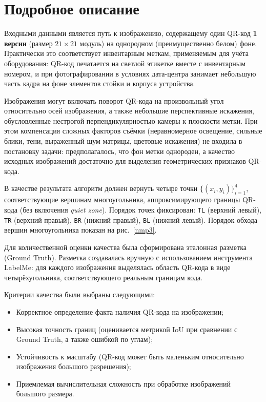 \section{Подробное описание}
Входными данными является путь к изображению, содержащему один QR-код \textbf{1 версии} (размер $21 \times 21$ модуль) на однородном (преимущественно белом) фоне.
Практически это соответствует инвентарным меткам, применяемым для учёта оборудования: QR-код печатается на светлой этикетке вместе с инвентарным номером, и при фотографировании в условиях дата-центра занимает небольшую часть кадра на фоне элементов стойки и корпуса устройства.

Изображения могут включать поворот QR-кода на произвольный угол относительно осей изображения, а также небольшие перспективные искажения, обусловленные нестрогой перпендикулярностью камеры к плоскости метки.
При этом компенсация сложных факторов съёмки (неравномерное освещение, сильные блики, тени, выраженный шум матрицы, цветовые искажения) не входила в постановку задачи: предполагалось, что фон метки однороден, а качество исходных изображений достаточно для выделения геометрических признаков QR-кода.

В качестве результата алгоритм должен вернуть четыре точки $\{(x_i, y_i)\}_{i=1}^{4}$,
соответствующие вершинам многоугольника, аппроксимирующего границы QR-кода (без включения \textit{quiet zone}).
Порядок точек фиксирован: \texttt{TL} (верхний левый), \texttt{TR} (верхний правый), \texttt{BR} (нижний правый), \texttt{BL} (нижний левый).
Порядок обхода вершин многоугольника показан на рис.~\ref{nmp3}.

Для количественной оценки качества была сформирована эталонная разметка (Ground Truth).
Разметка создавалась вручную с использованием инструмента LabelMe: для каждого изображения выделялась область QR-кода в виде четырёхугольника, соответствующего реальным границам кода.

Критерии качества были выбраны следующими:

\begin{itemize}
	\item Корректное определение факта наличия QR-кода на изображении;
	\item Высокая точность границ (оценивается метрикой IoU при сравнении с Ground Truth, а также ошибкой по углам);
	\item Устойчивость к масштабу (QR-код может быть маленьким относительно изображения большого разрешения);
	\item Приемлемая вычислительная сложность при обработке изображений большого размера.
\end{itemize}

